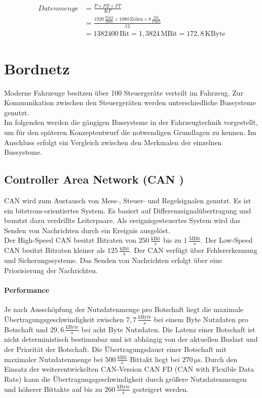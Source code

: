 \begin{align}
		Datenmenge &= \frac{P \times PZ \times FT}{KF} \label{eq:Bilddatenmenge}\\
		&= \frac{1920\,\frac{\mathrm{Pixel}}{\mathrm{Zeile}}\times 1080\,\mathrm{Zeilen} \times 8\,\frac{\mathrm{Bit}}{\mathrm{Pixel}}}{12} \\
		&= 1382400\,\mathrm{Bit} = 1,3824\,\mathrm{MBit} = 172,8\,\mathrm{KByte}
\end{align}
\section{Bordnetz}
Moderne Fahrzeuge besitzen über 100 Steuergeräte verteilt im Fahrzeug. Zur Kommunikation zwischen den Steuergeräten werden unterschiedliche Bussysteme genutzt. \\
Im folgenden werden die gängigen Bussysteme in der Fahrzeugtechnik vorgestellt, um für den späteren Konzeptentwurf die notwendigen Grundlagen zu kennen. Im Anschluss erfolgt ein Vergleich zwischen den Merkmalen der einzelnen Bussysteme.
\subsection{Controller Area Network (CAN )}
CAN wird zum Austausch von Mess-, Steuer- und Regelsignalen genutzt. Es ist ein bitstrom-orientiertes System. Es basiert auf Differenzsignalübertragung und benutzt dazu verdrillte Leiterpaare. Als ereignisgesteuertes System wird das Senden von Nachrichten durch ein Ereignis ausgelöst. \\
Der High-Speed CAN besitzt Bitraten von $ 250\,\frac{\mathrm{kBit}}{\mathrm{s}} $ bis zu $ 1\,\frac{\mathrm{MBit}}{\mathrm{s}}$.
Der Low-Speed CAN besitzt Bitraten kleiner als $ 125\,\frac{\mathrm{kBit}}{\mathrm{s}} $. 
Der CAN verfügt über Fehlererkennung und Sicherungssysteme. Das Senden von Nachrichten erfolgt über eine Priorisierung der Nachrichten. \cite[Vgl. Seite 57 ff.]{Zimmermann.2014}
\paragraph{Performance}
Je nach Ausschöpfung der Nutzdatenmenge pro Botschaft liegt die maximale Übertragungsgeschwindigkeit zwischen $ 7,7\,\frac{\mathrm{kByte}}{\mathrm{s}} $ bei einem Byte Nutzdaten pro Botschaft und $ 29,6\,\frac{\mathrm{kByte}}{\mathrm{s}} $ bei acht Byte Nutzdaten. Die Latenz einer Botschaft ist nicht deterministisch bestimmbar und ist abhängig von der aktuellen Buslast und der Priorität der Botschaft. Die Übertragungsdauer einer Botschaft mit maximaler Nutzdatenmenge bei $ 500\,\frac{\mathrm{kBit}}{\mathrm{s}} $ Bittakt liegt bei $ 270\,\mathrm{\mu s}$.
Durch den Einsatz der weiterentwickelten CAN-Version CAN FD (CAN with Flexible Data Rate) kann die Übertragungsgeschwindigkeit durch größere Nutzdatenmengen und höherer Bittakte auf bis zu $ 260\,\frac{\mathrm{kByte}}{\mathrm{s}} $ gesteigert werden. \cite[Vgl. Seite 76 ff.]{Zimmermann.2014}
